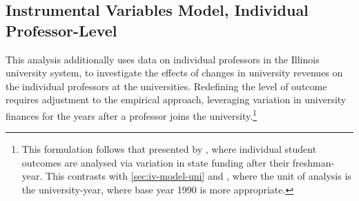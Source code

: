 

\subsection{Instrumental Variables Model, Individual Professor-Level}
\label{sec:iv-model-indiv}

This analysis additionally uses data on individual professors in the Illinois university system, to investigate the effects of changes in university revenues on the individual professors at the universities.
Redefining the level of outcome requires adjustment to the empirical approach, leveraging variation in university finances for the years after a professor joins the university.\footnote{
    This formulation follows that presented by \cite{NBERw27885}, where individual student outcomes are analysed via variation in state funding after their freshman-year.
    This contrasts with \autoref{sec:iv-model-uni} and \cite{NBERw23736}, where the unit of analysis is the university-year, where base year 1990 is more appropriate.
}

